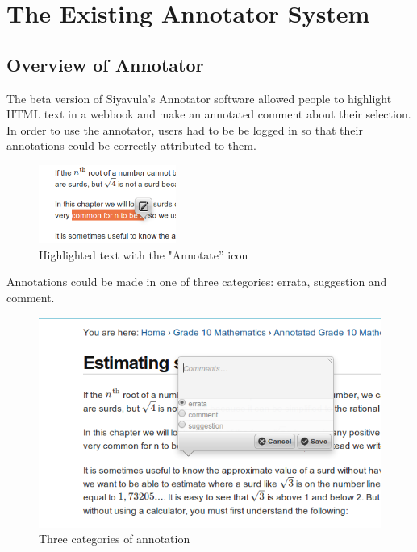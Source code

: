 
\chapter{The Existing Annotator System} %

\label{Chapter2} %



\section{Overview of Annotator}
The beta version of Siyavula's Annotator software allowed people to highlight HTML text in a webbook and make an annotated comment about their selection. In order to use the annotator, users had to be be logged in so that their annotations could be correctly attributed to them. 

\begin{figure}[h]
    \centering
    \includegraphics[width=0.4\textwidth]{Figures/annotator1.png}
 \caption{Highlighted text with the "Annotate'' icon}
\end{figure}

Annotations could be made in one of three categories: errata, suggestion and comment.
\begin{figure}[h]
    \centering
    \includegraphics[width=\textwidth]{Figures/annotatorcategories.png}
 \caption{Three categories of annotation}
\end{figure}

